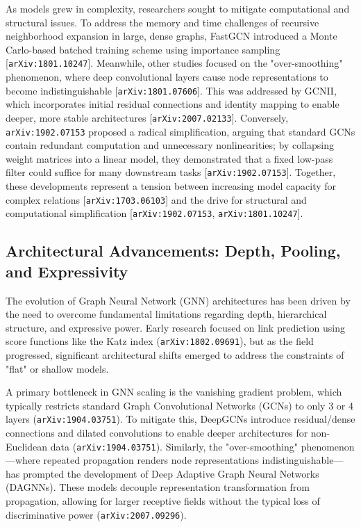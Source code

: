 \documentclass[11pt]{article}
\begin{document}
As models grew in complexity, researchers sought to mitigate computational and structural issues. To address the memory and time challenges of recursive neighborhood expansion in large, dense graphs, FastGCN introduced a Monte Carlo-based batched training scheme using importance sampling [\texttt{arXiv:1801.10247}]. Meanwhile, other studies focused on the "over-smoothing" phenomenon, where deep convolutional layers cause node representations to become indistinguishable [\texttt{arXiv:1801.07606}]. This was addressed by GCNII, which incorporates initial residual connections and identity mapping to enable deeper, more stable architectures [\texttt{arXiv:2007.02133}]. Conversely, \texttt{arXiv:1902.07153} proposed a radical simplification, arguing that standard GCNs contain redundant computation and unnecessary nonlinearities; by collapsing weight matrices into a linear model, they demonstrated that a fixed low-pass filter could suffice for many downstream tasks [\texttt{arXiv:1902.07153}]. Together, these developments represent a tension between increasing model capacity for complex relations [\texttt{arXiv:1703.06103}] and the drive for structural and computational simplification [\texttt{arXiv:1902.07153}, \texttt{arXiv:1801.10247}].

\subsection{Architectural Advancements: Depth, Pooling, and Expressivity}

The evolution of Graph Neural Network (GNN) architectures has been driven by the need to overcome fundamental limitations regarding depth, hierarchical structure, and expressive power. Early research focused on link prediction using score functions like the Katz index (\texttt{arXiv:1802.09691}), but as the field progressed, significant architectural shifts emerged to address the constraints of "flat" or shallow models.

A primary bottleneck in GNN scaling is the vanishing gradient problem, which typically restricts standard Graph Convolutional Networks (GCNs) to only 3 or 4 layers (\texttt{arXiv:1904.03751}). To mitigate this, DeepGCNs introduce residual/dense connections and dilated convolutions to enable deeper architectures for non-Euclidean data (\texttt{arXiv:1904.03751}). Similarly, the "over-smoothing" phenomenon—where repeated propagation renders node representations indistinguishable—has prompted the development of Deep Adaptive Graph Neural Networks (DAGNNs). These models decouple representation transformation from propagation, allowing for larger receptive fields without the typical loss of discriminative power (\texttt{arXiv:2007.09296}).
\end{document}
